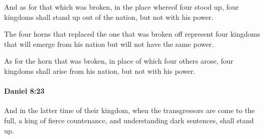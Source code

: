 			\begin{versebox}
					\item[BHS] 
					\item[LXX] 
					\item[ASV] And as for that which was broken, in the place whereof four stood up, four kingdoms shall stand up out of the nation, but not with his power.
					\item[NIV] The four horns that replaced the one that was broken off represent four kingdoms that will emerge from his nation but will not have the same power.
					\item[NRSV] As for the horn that was broken, in place of which four others arose, four kingdoms shall arise from his nation, but not with his power.
			\end{versebox}

		\paragraph{Daniel 8:23} %
			\label{DANIEL-8-23}

			And in the latter time of their kingdom, when the transgressors are come to the full, a king of fierce countenance, and understanding dark sentences, shall stand up.

